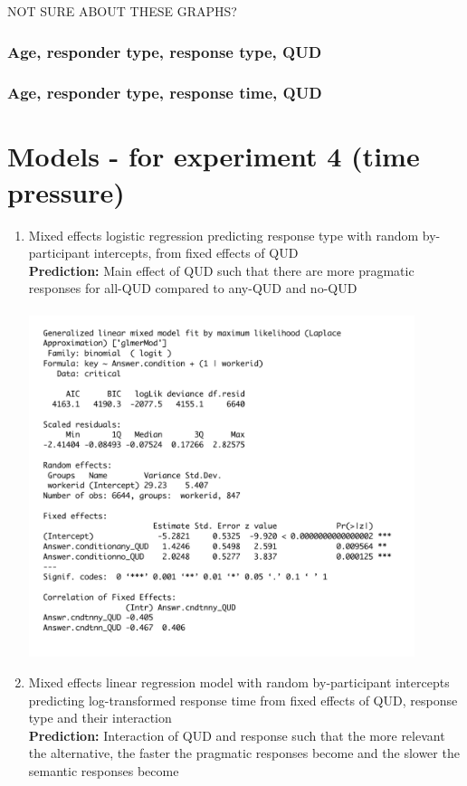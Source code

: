 \documentclass[12pt]{article}
\begin{document}
\pagebreak
NOT SURE ABOUT THESE GRAPHS?
\subsubsection*{Age, responder type, response type, QUD}
\subsubsection*{Age, responder type, response time, QUD}
\pagebreak

\section*{Models - for experiment 4 (time pressure)}
\begin{enumerate}    
\item Mixed effects logistic regression predicting response type with random by-participant intercepts, from fixed effects of QUD
\\
\textbf{Prediction:} Main effect of QUD such that there are more pragmatic responses for all-QUD compared to any-QUD and no-QUD
\\ \\
\includegraphics[height=10cm]{models/exp4_model1.pdf}
\pagebreak
\item Mixed effects linear regression model with random by-participant intercepts predicting log-transformed response time from fixed effects of QUD, response type and their interaction
\\
\textbf{Prediction:} Interaction of QUD and response such that the more relevant the alternative, the faster the pragmatic responses become and the slower the semantic responses become

\end{enumerate}
\end{document}
